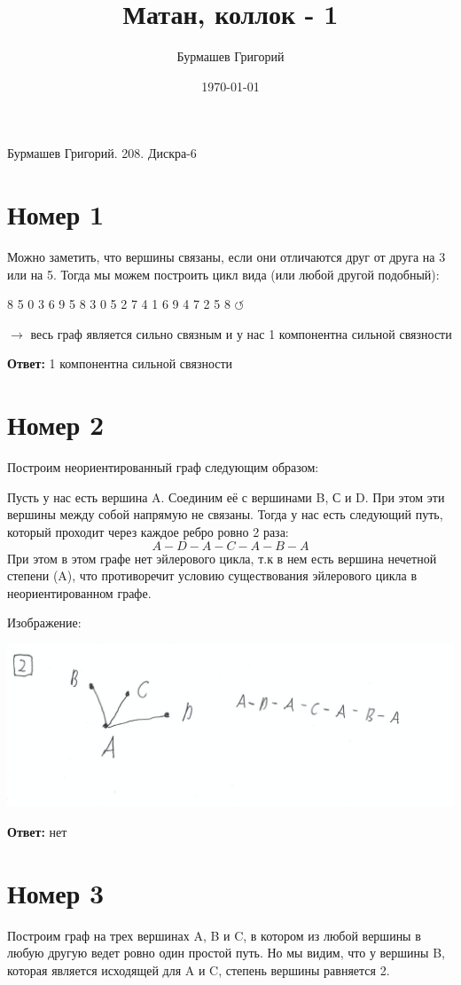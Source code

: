 \documentclass[a4paper,12pt]{article}
\author{Бурмашев Григорий}
\title{Матан, коллок - 1 }
\date{\today}
\begin{document}
\begin{center}
Бурмашев Григорий. 208. Дискра-6
\end{center}
\section*{Номер 1}
Можно заметить, что вершины связаны, если они отличаются друг от друга на 3 или на 5. Тогда мы можем построить цикл вида (или любой другой подобный):
\begin{center}
8 5 0 3 6 9 5 8 3 0 5 2 7 4 1 6 9 4 7 2 5 8 $ \circlearrowleft $
\end{center}
$\rightarrow$ весь граф является сильно связным и у нас 1 компонентна сильной связности
\begin{center}
\textbf{Ответ:} 1 компонентна сильной связности
\end{center}
\section*{Номер 2}
Построим неориентированный граф следующим образом:

Пусть у нас есть вершина A. Соединим её с вершинами B, С и D. При этом эти вершины между собой напрямую не связаны. Тогда у нас есть следующий путь, который проходит через каждое ребро ровно 2 раза:
\[
A - D - A - C - A - B - A
\]
При этом в этом графе нет эйлерового цикла, т.к в нем есть вершина нечетной степени (A), что противоречит условию существования эйлерового цикла в неориентированном графе.

Изображение:
\begin{center}
\includegraphics[scale=0.4]{2.png}
\end{center}
\begin{center}
\textbf{Ответ:} нет 
\end{center}
\section*{Номер 3}
Построим граф на трех вершинах A, B и C, в котором из любой вершины в любую другую ведет ровно один простой путь. Но мы видим, что у вершины B, которая является исходящей для A и C, степень вершины равняется 2.
\end{document}

